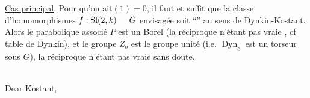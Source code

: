 \uline{Cas principal}. Pour qu'on ait\hspace{1.5em}$(1)=0$, il faut et suffit que  la classe d'homomorphismes $f:\operatorname{Sl}(2,k)\hspace{1.5em}G$ envisagée soit ``'' au sens de Dynkin-Kostant. Alors le parabolique associé $P$ est un Borel (la réciproque n'étant pas vraie , cf table de Dynkin), et le groupe $Z_o$ est le groupe unité (i.e. $\operatorname{Dyn}_c$ est un torseur sous $G$), la réciproque n'étant pas vraie sans doute.

\\

Dear Kostant,\\

